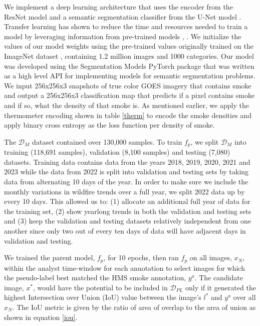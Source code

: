\documentclass{article}
\begin{document}
We implement a deep learning architecture that uses the encoder from the ResNet model \cite{resnet} and a semantic segmentation classifier from the U-Net model \cite{unet}. Transfer learning has shown to reduce the time and resources needed to train a model by leveraging information from pre-trained models \cite{transfer}, \cite{transfer2}.  We initialize the values of our model weights using the pre-trained values originally trained on the ImageNet dataset \cite{imgnet}, containing 1.2 million images and 1000 categories. Our model was developed using the Segmentation Models PyTorch package \cite{semantic} that was written as a high level API for implementing models for semantic segmentation problems.  We input 256x256x3 snapshots of true color GOES imagery that contains smoke and output a 256x256x3 classification map that predicts if a pixel contains smoke and if so, what the density of that smoke is. As mentioned earlier, we apply the thermometer encoding shown in table \ref{therm} to encode the smoke densities and apply binary cross entropy as the loss function per density of smoke. 

The \(\mathcal{D}_M\) dataset contained over 130,000 samples. To train \(f_p\), we split \(\mathcal{D}_M\) into training (118,691 samples), validation (8,100 samples) and testing (7,080) datasets. Training data contains data from the years 2018, 2019, 2020, 2021 and 2023 while the data from 2022 is split into validation and testing sets by taking data from alternating 10 days of the year. In order to make sure we include the monthly variations in wildfire trends over a full year, we split 2022 data up by every 10 days. This allowed us to: (1) allocate an additional full year of data for the training set, (2) show yearlong trends in both the validation and testing sets and (3) keep the validation and testing datasets relatively independent from one another since only two out of every ten days of data will have adjacent days in validation and testing.  

We trained the parent model, \(f_p\), for 10 epochs, then ran \(f_p\) on all images, \(x_N\), within the analyst time-window for each annotation to select images for which the pseudo-label best matched the HMS smoke annotation, \(y^a\). The candidate image, \(x^*\), would have the potential to be included in \(\mathcal{D}_{PL}\) only if it generated the highest Intersection over Union (IoU) value between the image's \(l^*\) and \(y^{a}\) over all \(x_N\). The IoU metric is given by the ratio of area of overlap to the area of union as shown in equation \ref{iou}. 
\end{document}

